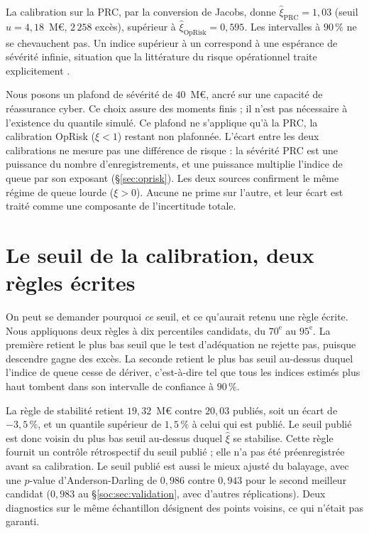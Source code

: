 La calibration sur la PRC, par la conversion de Jacobs, donne $\hat{\xi}_{\text{PRC}} = 1{,}03$ (seuil
$u = 4{,}18$~M\euro, $2\,258$ excès), supérieur à $\hat{\xi}_{\text{OpRisk}} = 0{,}595$. Les intervalles à
$90\,\%$ ne se chevauchent pas. Un indice supérieur à un correspond à une espérance de sévérité infinie,
situation que la littérature du risque opérationnel traite explicitement \citep{neslehova2006}.

Nous posons
un plafond de sévérité de $40$~M\euro, ancré sur une capacité de réassurance cyber. Ce choix assure des
moments finis ; il n'est pas nécessaire à l'existence du quantile simulé. Ce plafond ne s'applique qu'à la PRC, la calibration OpRisk ($\xi < 1$) restant
non plafonnée. L'écart entre les deux calibrations ne mesure pas une différence de risque : la sévérité PRC
est une puissance du nombre d'enregistrements, et une puissance multiplie l'indice de queue par son exposant
(\S\ref{sec:oprisk}). Les deux sources confirment le même régime de queue lourde ($\xi > 0$). Aucune ne
prime sur l'autre, et leur écart est traité comme une composante de l'incertitude totale.

\section{Le seuil de la calibration, deux règles écrites}
\label{sec:ann-seuil}

On peut se demander pourquoi \emph{ce} seuil, et ce qu'aurait retenu une règle écrite. Nous appliquons deux
règles à dix percentiles candidats, du $70^{\text{e}}$ au $95^{\text{e}}$. La première retient le plus bas
seuil que le test d'adéquation ne rejette pas, puisque descendre gagne des excès. La seconde retient le plus
bas seuil au-dessus duquel l'indice de queue cesse de dériver, c'est-à-dire tel que tous les indices
estimés plus haut tombent dans son intervalle de confiance à $90\,\%$.

La règle de stabilité retient $19{,}32$~M\euro{} contre $20{,}03$ publiés, soit un écart de $-3{,}5\,\%$, et un
quantile supérieur de $1{,}5\,\%$ à celui qui est publié. Le seuil publié est donc voisin du plus bas
seuil au-dessus duquel $\hat\xi$ se stabilise. Cette règle fournit un contrôle rétrospectif du seuil publié ; elle n'a pas été préenregistrée avant sa calibration. Le seuil publié est aussi
le mieux ajusté du balayage, avec une $p$-value d'Anderson-Darling de $0{,}986$ contre $0{,}943$ pour le
second meilleur candidat ($0{,}983$ au \S\ref{soc:sec:validation}, avec d'autres réplications). Deux diagnostics sur le même échantillon désignent des points voisins, ce qui n'était pas garanti.

